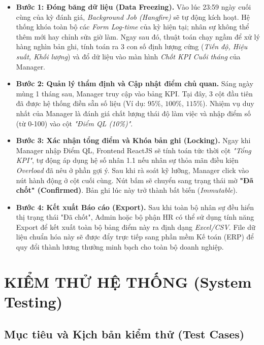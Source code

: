 \documentclass[a4paper,13.5pt]{extreport}
\begin{document}
\begin{itemize}
    \item \textbf{Bước 1: Đóng băng dữ liệu (Data Freezing).} Vào lúc 23:59 ngày cuối cùng của kỳ đánh giá, \textit{Background Job (Hangfire)} sẽ tự động kích hoạt. Hệ thống khóa toàn bộ các \textit{Form Log-time} của kỳ hiện tại; nhân sự không thể thêm mới hay chỉnh sửa giờ làm. Ngay sau đó, thuật toán chạy ngầm để xử lý hàng nghìn bản ghi, tính toán ra 3 con số định lượng cứng (\textit{Tiến độ, Hiệu suất, Khối lượng}) và đổ dữ liệu vào màn hình \textit{Chốt KPI Cuối tháng} của Manager.
    
    \item \textbf{Bước 2: Quản lý thẩm định và Cập nhật điểm chủ quan.} Sáng ngày mùng 1 tháng sau, Manager truy cập vào bảng KPI. Tại đây, 3 cột đầu tiên đã được hệ thống điền sẵn số liệu (Ví dụ: $95\%$, $100\%$, $115\%$). Nhiệm vụ duy nhất của Manager là đánh giá chất lượng thái độ làm việc và nhập điểm số (từ 0-100) vào cột \textit{"Điểm QL (10\%)"}. 
    
    \item \textbf{Bước 3: Xác nhận tổng điểm và Khóa bản ghi (Locking).} Ngay khi Manager nhập Điểm QL, Frontend ReactJS sẽ tính toán tức thời cột \textit{"Tổng KPI"}, tự động áp dụng hệ số nhân 1.1 nếu nhân sự thỏa mãn điều kiện \textit{Overload} đã nêu ở phần gợi ý. Sau khi rà soát kỹ lưỡng, Manager click vào nút hành động ở cột cuối cùng. Nút bấm sẽ chuyển sang trạng thái mờ \textbf{"Đã chốt" (Confirmed)}. Bản ghi lúc này trở thành bất biến (\textit{Immutable}).
    
    \item \textbf{Bước 4: Kết xuất Báo cáo (Export).} Sau khi toàn bộ nhân sự đều hiển thị trạng thái "Đã chốt", Admin hoặc bộ phận HR có thể sử dụng tính năng Export để kết xuất toàn bộ bảng điểm này ra định dạng \textit{Excel/CSV}. File dữ liệu chuẩn hóa này sẽ được đẩy trực tiếp sang phần mềm Kế toán (ERP) để quy đổi thành lương thưởng minh bạch cho toàn bộ doanh nghiệp.
\end{itemize} 

\chapter{KIỂM THỬ HỆ THỐNG (System Testing)}

\section{Mục tiêu và Kịch bản kiểm thử (Test Cases)}
\end{document}
